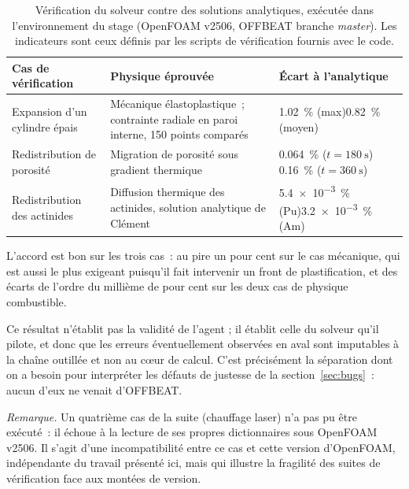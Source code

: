 \documentclass[12pt,a4paper,french]{report}
\begin{document}
\begin{table}[htbp]
\centering
\caption[Vérification contre des solutions analytiques]{Vérification du solveur contre des solutions analytiques, exécutée
dans l'environnement du stage (OpenFOAM v2506, OFFBEAT branche \textit{master}).
Les indicateurs sont ceux définis par les scripts de vérification fournis avec
le code.}
\label{tab:verif}
\small
\begin{tabularx}{\textwidth}{@{}>{\raggedright\arraybackslash}p{3.4cm}Xl@{}}
\toprule
\textbf{Cas de vérification} & \textbf{Physique éprouvée} &
\textbf{Écart à l'analytique}\\
\midrule
Expansion d'un cylindre épais &
  Mécanique élastoplastique~; contrainte radiale en paroi interne,
  \num{150} points comparés &
  \SI{1.02}{\percent} (max)\newline \SI{0.82}{\percent} (moyen)\\
\addlinespace
Redistribution de porosité &
  Migration de porosité sous gradient thermique &
  \SI{0.064}{\percent} ($t=\SI{180}{\second}$)\newline
  \SI{0.16}{\percent} ($t=\SI{360}{\second}$)\\
\addlinespace
Redistribution des actinides &
  Diffusion thermique des actinides, solution analytique de Clément &
  \num{5.4e-3}~\% (Pu)\newline \num{3.2e-3}~\% (Am)\\
\bottomrule
\end{tabularx}
\end{table}

L'accord est bon sur les trois cas~: au pire un pour cent sur le cas mécanique,
qui est aussi le plus exigeant puisqu'il fait intervenir un front de
plastification, et des écarts de l'ordre du millième de pour cent sur les deux
cas de physique combustible.

Ce résultat n'établit pas la validité de l'agent ; il établit celle du solveur
qu'il pilote, et donc que les erreurs éventuellement observées en aval sont
imputables à la chaîne outillée et non au c\oe ur de calcul. C'est précisément
la séparation dont on a besoin pour interpréter les défauts de justesse de la
section~\ref{sec:bugs}~: aucun d'eux ne venait d'OFFBEAT.

\vspace{0.2cm}
\noindent
\textit{Remarque.} Un quatrième cas de la suite (chauffage laser) n'a pas pu
être exécuté~: il échoue à la lecture de ses propres dictionnaires sous
OpenFOAM v2506. Il s'agit d'une incompatibilité entre ce cas et cette version
d'OpenFOAM, indépendante du travail présenté ici, mais qui illustre la fragilité
des suites de vérification face aux montées de version.
\end{document}
